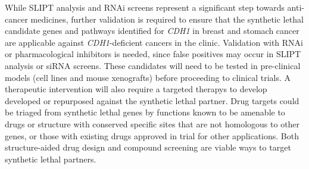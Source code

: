 
While \gls{SLIPT} analysis and \gls{RNAi} screens represent a significant step towards anti-cancer medicines, further validation is required to ensure that the \gls{synthetic lethal} candidate genes and pathways identified for \textit{CDH1} in breast and stomach cancer are applicable against \textit{CDH1}-deficient cancers in the clinic.  Validation with \gls{RNAi} or pharmacological inhibitors is needed, since false positives may occur in \gls{SLIPT} analysis or \gls{siRNA} screens. These candidates will need to be tested in pre-clinical models (cell lines and mouse xenografts) before proceeding to clinical trials. A therapeutic intervention will also require a \glspl{targeted therapy}  to develop developed or repurposed against the \gls{synthetic lethal} partner. 
Drug targets could be triaged from \gls{synthetic lethal} genes by functions known to be amenable to drugs or structure with conserved specific sites that are not homologous to other genes, or those with existing drugs approved in trial for other applications. Both structure-aided drug design and compound screening are viable ways to target \gls{synthetic lethal} partners. %

